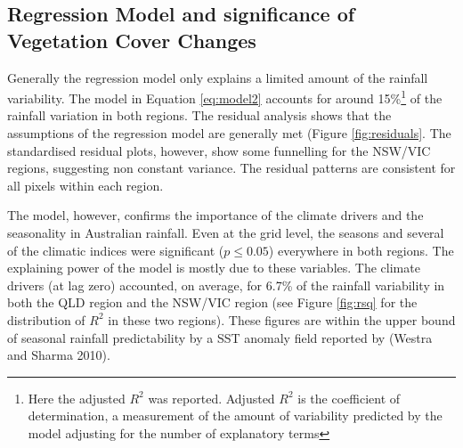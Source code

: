 \documentclass[]{elsarticle} %
\theoremstyle{definition}
\theoremstyle{definition}
\theoremstyle{definition}
\theoremstyle{remark}
\begin{document}
\subsection{Regression Model and significance of Vegetation Cover
Changes}\label{regression-model-and-significance-of-vegetation-cover-changes}

Generally the regression model only explains a limited amount of the
rainfall variability. The model in Equation \eqref{eq:model2} accounts for
around
15\%\footnote{Here the adjusted $R^2$ was reported. Adjusted $R^2$ is the coefficient of determination, a measurement of the amount of variability predicted by the model adjusting for the number of explanatory terms}
of the rainfall variation in both regions. The residual analysis shows
that the assumptions of the regression model are generally met (Figure
\ref{fig:residuals}. The standardised residual plots, however, show some
funnelling for the NSW/VIC regions, suggesting non constant variance.
The residual patterns are consistent for all pixels within each region.

The model, however, confirms the importance of the climate drivers and
the seasonality in Australian rainfall. Even at the grid level, the
seasons and several of the climatic indices were significant
(\(p \leq 0.05\)) everywhere in both regions. The explaining power of
the model is mostly due to these variables. The climate drivers (at lag
zero) accounted, on average, for 6.7\% of the rainfall variability in
both the QLD region and the NSW/VIC region (see Figure \ref{fig:rsq} for
the distribution of \(R^2\) in these two regions). These figures are
within the upper bound of seasonal rainfall predictability by a SST
anomaly field reported by (Westra and Sharma 2010).
\end{document}
